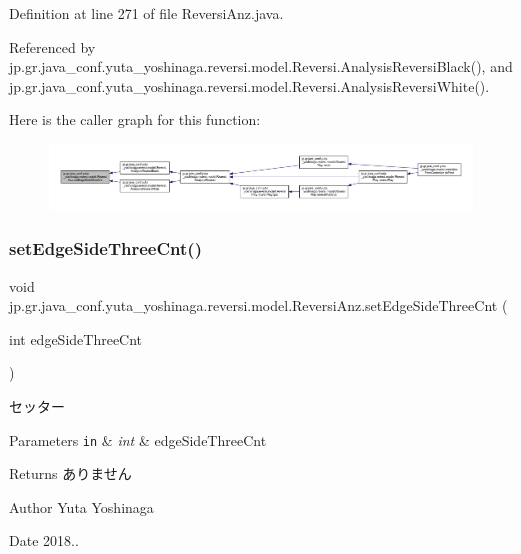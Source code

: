 Definition at line 271 of file Reversi\+Anz.\+java.



Referenced by jp.\+gr.\+java\+\_\+conf.\+yuta\+\_\+yoshinaga.\+reversi.\+model.\+Reversi.\+Analysis\+Reversi\+Black(), and jp.\+gr.\+java\+\_\+conf.\+yuta\+\_\+yoshinaga.\+reversi.\+model.\+Reversi.\+Analysis\+Reversi\+White().

Here is the caller graph for this function\+:
\nopagebreak
\begin{figure}[H]
\begin{center}
\leavevmode
\includegraphics[width=350pt]{classjp_1_1gr_1_1java__conf_1_1yuta__yoshinaga_1_1reversi_1_1model_1_1_reversi_anz_a00da6644a1ea7ef66e51eb08a4fa8177_icgraph}
\end{center}
\end{figure}
\mbox{\label{classjp_1_1gr_1_1java__conf_1_1yuta__yoshinaga_1_1reversi_1_1model_1_1_reversi_anz_afb1fe81327e740d133aa623902cacab0}} 
\subsubsection{\texorpdfstring{set\+Edge\+Side\+Three\+Cnt()}{setEdgeSideThreeCnt()}}
{\footnotesize\ttfamily void jp.\+gr.\+java\+\_\+conf.\+yuta\+\_\+yoshinaga.\+reversi.\+model.\+Reversi\+Anz.\+set\+Edge\+Side\+Three\+Cnt (\begin{DoxyParamCaption}\item[{int}]{edge\+Side\+Three\+Cnt }\end{DoxyParamCaption})}



セッター 


\begin{DoxyParams}[1]{Parameters}
\mbox{\tt in}  & {\em int} & edge\+Side\+Three\+Cnt \\
\hline
\end{DoxyParams}
\begin{DoxyReturn}{Returns}
ありません 
\end{DoxyReturn}
\begin{DoxyAuthor}{Author}
Yuta Yoshinaga 
\end{DoxyAuthor}
\begin{DoxyDate}{Date}
2018.. 
\end{DoxyDate}


